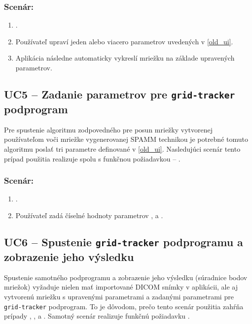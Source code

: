 \subsubsection*{Scenár:}
\begin {enumerate}
\item {.}
\item {Používateľ upraví jeden alebo viacero parametrov uvedených v \ref{old_ui}.}
\item {Aplikácia následne automaticky vykreslí mriežku na základe upravených parametrov.}
\end {enumerate}

\subsection {UC5 -- Zadanie parametrov pre \texttt{grid-tracker} podprogram}\label{uc5}
Pre spustenie algoritmu zodpovedného pre posun mriežky vytvorenej používateľom voči mriežke vygenerovanej SPAMM technikou je potrebné tomuto algoritmu poslať tri parametre definované v \ref{old_ui}. Nasledujúci scenár tento prípad použitia realizuje spolu s funkčnou požiadavkou -- .

\subsubsection*{Scenár:}
\begin {enumerate}
\item {.}
\item {Používateľ zadá číselné hodnoty parametrov ,  a .}
\end {enumerate}

\subsection {UC6 -- Spustenie \texttt{grid-tracker} podprogramu a zobrazenie jeho výsledku}
Spustenie samotného podprogramu a zobrazenie jeho výsledku (súradnice bodov mriežok) vyžaduje nielen mať importované DICOM snímky v aplikácii, ale aj vytvorenú mriežku s upravenými parametrami a zadanými parametrami pre \texttt{grid-tracker} podprogram. To je dôvodom, prečo tento scenár použitia zahŕňa prípady , ,  a . Samotný scenár realizuje funkčnú požiadavku .

